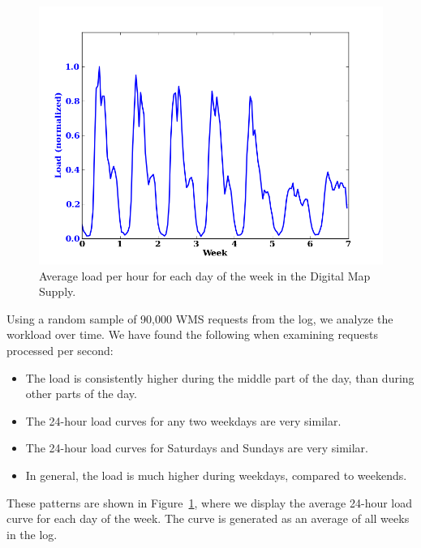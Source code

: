 \documentclass[11pt, oneside]{report}
\begin{document}
\begin{figure}
\centering
\includegraphics[scale=0.5]{figs-tileheat/average_load_week.png}
\caption{Average load per hour for each day of the week in the Digital Map Supply.}
\label{fig:weekload}
\end{figure}

Using a random sample of 90,000 WMS requests from the log, we analyze the workload over time. We have found the following when examining requests processed per second:

\begin{itemize}
\item The load is consistently higher during the middle part of the day, than during other parts of the day.
\item The 24-hour load curves for any two weekdays are very similar.
\item The 24-hour load curves for Saturdays and Sundays are very similar.
\item In general, the load is much higher during weekdays, compared to weekends.
\end{itemize}

These patterns are shown in Figure~\ref{fig:weekload}, where we display the average 24-hour load curve for each day of the week. The curve is generated as an average of all weeks in the log.
\end{document}
